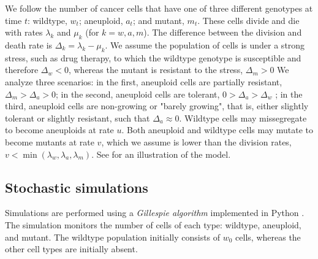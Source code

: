 \documentclass[12pt]{extarticle}
\begin{document}
We follow the number of cancer cells that have one of three different genotypes at time $t$: wildtype, $w_t$; aneuploid, $a_t$; and mutant, $m_t$. 
These cells divide and die with rates $\lambda_k$ and $\mu_k$ (for $k=w, a, m$).
The difference between the division and death rate is $\Delta_k = \lambda_k-\mu_k$.
We assume the population of cells is under a strong stress, such as drug therapy, to which the wildtype genotype is susceptible and therefore $\Delta_w<0$, whereas the mutant is resistant to the stress, $\Delta_m>0$
We analyze three scenarios: in the first, aneuploid cells are partially resistant, $\Delta_m>\Delta_a>0$; in the second, aneuploid cells are tolerant, $0>\Delta_a>\Delta_w$ \citep[see][for the distinction between susceptible, resistant, and tolerant]{brauner2016distinguishing}; in the third, aneuploid cells are non-growing or "barely growing", that is, either slightly tolerant or slightly resistant, such that $\Delta_a \approx 0$.
Wildtype cells may missegregate to become aneuploids at rate $u$. Both aneuploid and wildtype cells may mutate to become mutants at rate $v$, which we assume is lower than the division rates, $v<\min{(\lambda_w, \lambda_a, \lambda_m)}$.
See  for an illustration of the model.


\subsection*{Stochastic simulations} 
Simulations are performed using a \emph{Gillespie algorithm} \citep{gillespie1976general,gillespie1977exact} implemented in Python \citep{python}.
The simulation monitors the number of cells of each type: wildtype, aneuploid, and mutant. 
The wildtype population initially consists of $w_0$ cells, whereas the other cell types are initially absent.
\end{document}
